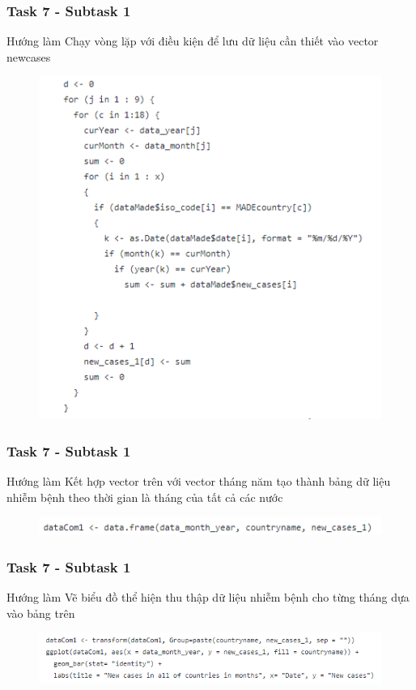 \documentclass[english,10pt,table]{beamer}
\begin{document}
{
    \frametitle{Task 7 - Subtask 1}
    \begin{block}{Hướng làm}
    Chạy vòng lặp với điều kiện để lưu dữ liệu cần thiết vào vector newcases
	\begin{figure}[H]
		\centering
		\includegraphics[scale=0.55]{images/7.0.3.png}
	\end{figure}
    \end{block}
}
\frame
{
    \frametitle{Task 7 - Subtask 1}
    \begin{block}{Hướng làm}
    Kết hợp vector trên với vector tháng năm tạo thành bảng dữ liệu nhiễm bệnh theo thời gian là tháng của tất cả các nước
	\begin{figure}[H]
		\centering
		\includegraphics[scale=0.55]{images/7.0.4.png}
	\end{figure}
    \end{block}
}
\frame
{
    \frametitle{Task 7 - Subtask 1}
    \begin{block}{Hướng làm}
    Vẽ biểu đồ thể hiện thu thập dữ liệu nhiễm bệnh cho từng tháng dựa vào bảng trên
	\begin{figure}[H]
		\centering
		\includegraphics[scale=0.6]{images/7.0.5.png}
	\end{figure}
    \end{block}
}
\end{document}
